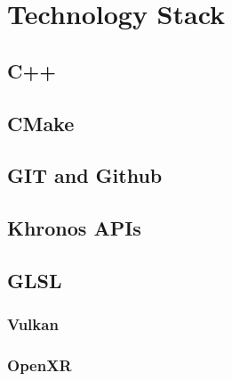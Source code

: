 \newpage
\section{Technology Stack} %
\subsection{C++}
\subsection{CMake}
\subsection{GIT and Github}
\subsection{Khronos APIs}
\subsection{GLSL}
\label{sec:glsl}
\subsubsection{Vulkan}
\label{sec:stack_vk}
\subsubsection{OpenXR}
\label{sec:stack_xr}